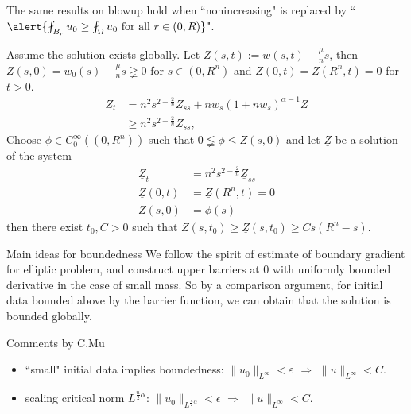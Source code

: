 \begin{frame}
The same results on blowup hold when ``nonincreasing" is replaced by ``$\alert{\fint_{B_r}u_0\geq \fint_{\Omega}u_0 \text{ for all } r\in(0, R)}$". 

Assume the solution exists globally. Let $Z(s,t) := w(s,t) - \frac{\mu}{n}s$, then $Z(s,0)= w_0(s) - \frac{\mu}{n}s\gneqq 0$ for $s\in(0, R^n)$ and $Z(0, t) = Z(R^n, t) = 0$ for $t>0$.
\begin{align*}
    Z_t &= n^2s^{2-\frac2n}Z_{ss} + nw_s(1+nw_s)^{\alpha -1}Z\\
    &\geq n^2s^{2-\frac2n}Z_{ss},
\end{align*} 
Choose $\phi\in C_0^{\infty}((0,R^n))$ such that $0\lneqq \phi\leq Z(s, 0)$ and let $\underline{Z}$ be a solution of the system
\begin{align*}
    \underline{Z}_t &= n^2s^{2-\frac2n}\underline{Z}_{ss}\\
    \underline{Z}(0, t) &= \underline{Z}(R^n, t) = 0\\
    \underline{Z}(s, 0) &= \phi(s) 
\end{align*}
 then there exist $t_0, C>0$ such that $Z(s,t_0)\geq \underline{Z}(s, t_0)\geq Cs(R^n-s)$.
\end{frame}

\begin{frame}{Main ideas for boundedness}
We follow the spirit of estimate of boundary gradient for elliptic problem, and construct upper barriers at $0$ with uniformly bounded derivative in the case of small mass. So by a comparison argument, for initial data bounded above by the barrier function, we can obtain that the solution is bounded globally.
\begin{block}{Comments by C.Mu}
\begin{itemize}
\item ``small" initial data implies boundedness: $\|u_0\|_{L^\infty}<\varepsilon$ $\Rightarrow$ $\|u\|_{L^\infty}<C$.
\item scaling critical norm $L^{\frac{n}{2}\alpha}$: $\|u_0\|_{L^{\frac{n}{2}\alpha}}<\epsilon$ $\Rightarrow$ $\|u\|_{L^\infty}<C$. 
\end{itemize}
\end{block}
\end{frame} 







